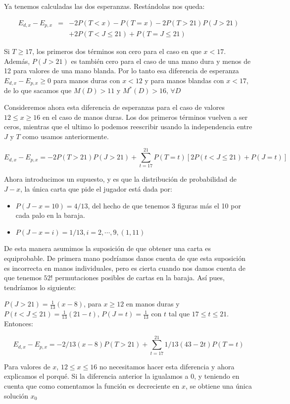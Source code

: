 \documentclass[12pt,a4paper,]{book}
\numberwithin{dummy}{section}
\theoremstyle{ocrenumbox}
\theoremstyle{blacknumex}
\theoremstyle{blacknumbox}
\theoremstyle{ocrenum}
\theoremstyle{ocrenum}
\begin{document}
Ya tenemos calculadas las dos esperanzas. Restándolas nos queda:

\[
\begin{array}{ccl}
E_{d,x} -E_{p,x} & = & -2P(T<x) - P(T=x) -2P(T>21)P(J>21) \\
                 &   & + 2P(T<J \leq 21)+P(T=J \leq 21)
\end{array}
\]

Si \(T \geq 17\), los primeros dos términos son cero para el caso en que
\(x<17\). Además, \(P(J>21)\) es también cero para el caso de una mano
dura y menos de 12 para valores de una mano blanda. Por lo tanto esa
diferencia de esperanza \(E_{d,x} -E_{p,x} \geq 0\) para manos duras con
\(x<12\) y para manos blandas con \(x<17\), de lo que sacamos que
\(M(D)>11\) y \(M^*(D)>16\), \(\forall D\)

Consideremos ahora esta diferencia de esperanzas para el caso de valores
\(12 \leq x \geq 16\) en el caso de manos duras. Los dos primeros
términos vuelven a ser ceros, mientras que el ultimo lo podemos
reescribir usando la independencia entre \(J\) y \(T\) como usamos
anteriormente.

\[
E_{d,x} -E_{p,x} = -2P(T>21)P(J>21) + \sum_{t=17}^{21} P(T=t)[2P(t<J \leq 21) + P(J=t)]
\]

Ahora introducimos un supuesto, y es que la distribución de probabilidad
de \(J-x\), la única carta que pide el jugador está dada por:

\begin{itemize}
\item
  \(P(J-x=10) = 4/13\), del hecho de que tenemos 3 figuras más el 10 por
  cada palo en la baraja.
\item
  \(P(J-x=i) = 1/13, i=2,\cdots,9, (1,11)\)
\end{itemize}

De esta manera asumimos la suposición de que obtener una carta es
equiprobable. De primera mano podríamos danos cuenta de que esta
suposición es incorrecta en manos individuales, pero es cierta cuando
nos damos cuenta de que tenemos \(52!\) permutaciones posibles de cartas
en la baraja. Así pues, tendríamos lo siguiente:

\(P(J>21) = \frac{1}{13}(x-8)\), para \(x \geq 12\) en manos duras y
\(P(t<J \leq 21)=\frac{1}{13}(21-t)\), \(P(J=t) = \frac{1}{13}\) con
\(t\) tal que \(17 \leq t \leq 21\). Entonces:

\[
E_{d,x} - E_{p,x} = -2/13(x-8)P(T>21) + \sum_{t=17}^{21} 1/13(43-2t)P(T=t)
\]

Para valores de \(x\), \(12 \leq x \leq 16\) no necesitamos hacer esta
diferencia y ahora explicamos el porqué. Si la diferencia anterior la
igualamos a 0, y teniendo en cuenta que como comentamos la función es
decreciente en \(x\), se obtiene una única solución \(x_0\)
\end{document}
